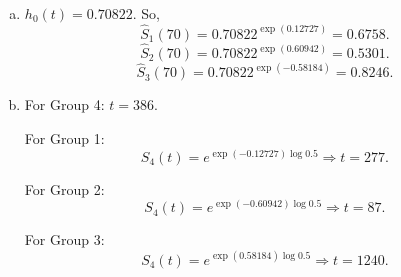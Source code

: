 \documentclass[12pt]{elegantbook}
\begin{document}
    \begin{solution}
        \begin{enumerate}[(a)]
            \item $h_0(t)=0.70822$. So, 
            \[\hat{S}_1(70)=0.70822^{\exp(0.12727)}=0.6758. \]
            \[\hat{S}_2(70)=0.70822^{\exp(0.60942)}=0.5301. \]
            \[\hat{S}_3(70)=0.70822^{\exp(-0.58184)}=0.8246. \]
            \item For Group 4: $t=386$. 
            
            For Group 1: \[S_4(t)=e^{\exp(-0.12727)\log 0.5}\Rightarrow t=277. \]

            For Group 2: \[S_4(t)=e^{\exp(-0.60942)\log 0.5}\Rightarrow t=87. \]

            For Group 3: \[S_4(t)=e^{\exp(0.58184)\log 0.5}\Rightarrow t=1240. \]
        \end{enumerate}
    \end{solution}
    
\end{document}

